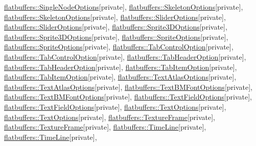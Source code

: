 \hyperlink{structflatbuffers_1_1SingleNodeOptions}{flatbuffers\+::\+Single\+Node\+Options}{\ttfamily  \mbox{[}private\mbox{]}}, \hyperlink{structflatbuffers_1_1SkeletonOptions}{flatbuffers\+::\+Skeleton\+Options}{\ttfamily  \mbox{[}private\mbox{]}}, \hyperlink{structflatbuffers_1_1SkeletonOptions}{flatbuffers\+::\+Skeleton\+Options}{\ttfamily  \mbox{[}private\mbox{]}}, \hyperlink{structflatbuffers_1_1SliderOptions}{flatbuffers\+::\+Slider\+Options}{\ttfamily  \mbox{[}private\mbox{]}}, \hyperlink{structflatbuffers_1_1SliderOptions}{flatbuffers\+::\+Slider\+Options}{\ttfamily  \mbox{[}private\mbox{]}}, \hyperlink{structflatbuffers_1_1Sprite3DOptions}{flatbuffers\+::\+Sprite3\+D\+Options}{\ttfamily  \mbox{[}private\mbox{]}}, \hyperlink{structflatbuffers_1_1Sprite3DOptions}{flatbuffers\+::\+Sprite3\+D\+Options}{\ttfamily  \mbox{[}private\mbox{]}}, \hyperlink{structflatbuffers_1_1SpriteOptions}{flatbuffers\+::\+Sprite\+Options}{\ttfamily  \mbox{[}private\mbox{]}}, \hyperlink{structflatbuffers_1_1SpriteOptions}{flatbuffers\+::\+Sprite\+Options}{\ttfamily  \mbox{[}private\mbox{]}}, \hyperlink{structflatbuffers_1_1TabControlOption}{flatbuffers\+::\+Tab\+Control\+Option}{\ttfamily  \mbox{[}private\mbox{]}}, \hyperlink{structflatbuffers_1_1TabControlOption}{flatbuffers\+::\+Tab\+Control\+Option}{\ttfamily  \mbox{[}private\mbox{]}}, \hyperlink{structflatbuffers_1_1TabHeaderOption}{flatbuffers\+::\+Tab\+Header\+Option}{\ttfamily  \mbox{[}private\mbox{]}}, \hyperlink{structflatbuffers_1_1TabHeaderOption}{flatbuffers\+::\+Tab\+Header\+Option}{\ttfamily  \mbox{[}private\mbox{]}}, \hyperlink{structflatbuffers_1_1TabItemOption}{flatbuffers\+::\+Tab\+Item\+Option}{\ttfamily  \mbox{[}private\mbox{]}}, \hyperlink{structflatbuffers_1_1TabItemOption}{flatbuffers\+::\+Tab\+Item\+Option}{\ttfamily  \mbox{[}private\mbox{]}}, \hyperlink{structflatbuffers_1_1TextAtlasOptions}{flatbuffers\+::\+Text\+Atlas\+Options}{\ttfamily  \mbox{[}private\mbox{]}}, \hyperlink{structflatbuffers_1_1TextAtlasOptions}{flatbuffers\+::\+Text\+Atlas\+Options}{\ttfamily  \mbox{[}private\mbox{]}}, \hyperlink{structflatbuffers_1_1TextBMFontOptions}{flatbuffers\+::\+Text\+B\+M\+Font\+Options}{\ttfamily  \mbox{[}private\mbox{]}}, \hyperlink{structflatbuffers_1_1TextBMFontOptions}{flatbuffers\+::\+Text\+B\+M\+Font\+Options}{\ttfamily  \mbox{[}private\mbox{]}}, \hyperlink{structflatbuffers_1_1TextFieldOptions}{flatbuffers\+::\+Text\+Field\+Options}{\ttfamily  \mbox{[}private\mbox{]}}, \hyperlink{structflatbuffers_1_1TextFieldOptions}{flatbuffers\+::\+Text\+Field\+Options}{\ttfamily  \mbox{[}private\mbox{]}}, \hyperlink{structflatbuffers_1_1TextOptions}{flatbuffers\+::\+Text\+Options}{\ttfamily  \mbox{[}private\mbox{]}}, \hyperlink{structflatbuffers_1_1TextOptions}{flatbuffers\+::\+Text\+Options}{\ttfamily  \mbox{[}private\mbox{]}}, \hyperlink{structflatbuffers_1_1TextureFrame}{flatbuffers\+::\+Texture\+Frame}{\ttfamily  \mbox{[}private\mbox{]}}, \hyperlink{structflatbuffers_1_1TextureFrame}{flatbuffers\+::\+Texture\+Frame}{\ttfamily  \mbox{[}private\mbox{]}}, \hyperlink{structflatbuffers_1_1TimeLine}{flatbuffers\+::\+Time\+Line}{\ttfamily  \mbox{[}private\mbox{]}}, \hyperlink{structflatbuffers_1_1TimeLine}{flatbuffers\+::\+Time\+Line}{\ttfamily  \mbox{[}private\mbox{]}}, 